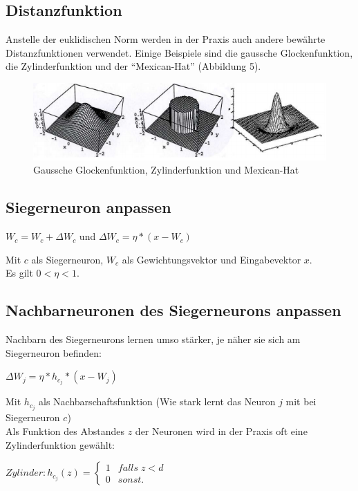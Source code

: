 \documentclass[11pt]{article}
\begin{document}
    \subsection{Distanzfunktion}
    Anstelle der euklidischen Norm werden in der Praxis auch andere bewährte Distanzfunktionen
    verwendet. Einige Beispiele sind die gaussche Glockenfunktion, die Zylinderfunktion und der
    "`Mexican-Hat"' (Abbildung 5).

    \begin{figure}[ht!]
        \centering
        \includegraphics[width=12cm]{../../resources/distanzfunktionen.png}
        \caption{Gaussche Glockenfunktion, Zylinderfunktion und Mexican-Hat}
    \end{figure}


    \subsection{Siegerneuron anpassen}
    \begin{center}
        $W_c = W_c + \Delta W_c$ und $\Delta W_c = \eta * (x-W_c)$
    \end{center}
    Mit $c$ als Siegerneuron, $W_c$ als Gewichtungsvektor und Eingabevektor $x$.\\
    Es gilt $0 < \eta < 1$.


    \subsection{Nachbarneuronen des Siegerneurons anpassen}
    Nachbarn des Siegerneurons lernen umso stärker, je näher sie sich am Siegerneuron befinden:
    \begin{center}
        $\Delta W_j = \eta * h_c_j * (x - W_j)$
    \end{center}
    Mit $h_c_j$ als Nachbarschaftsfunktion (Wie stark lernt das Neuron $j$ mit bei Siegerneuron $c$)\\
    Als Funktion des Abstandes $z$ der Neuronen wird in der Praxis oft eine Zylinderfunktion gewählt:
    \begin{center}
        $Zylinder: h_c_j(z) =
        \begin{cases}
            1 & falls \; z < d\\
            0 & sonst.
        \end{cases}$
    \end{center}
\end{document}
